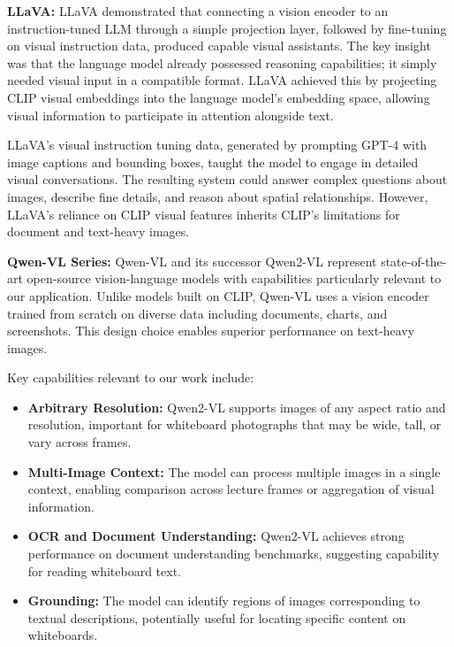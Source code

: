 \textbf{LLaVA:} LLaVA \cite{Liu2023LLaVA} demonstrated that connecting a vision encoder to an instruction-tuned LLM through a simple projection layer, followed by fine-tuning on visual instruction data, produced capable visual assistants. The key insight was that the language model already possessed reasoning capabilities; it simply needed visual input in a compatible format. LLaVA achieved this by projecting CLIP visual embeddings into the language model's embedding space, allowing visual information to participate in attention alongside text.

LLaVA's visual instruction tuning data, generated by prompting GPT-4 with image captions and bounding boxes, taught the model to engage in detailed visual conversations. The resulting system could answer complex questions about images, describe fine details, and reason about spatial relationships. However, LLaVA's reliance on CLIP visual features inherits CLIP's limitations for document and text-heavy images.

\textbf{Qwen-VL Series:} Qwen-VL \cite{Bai2023QwenVL} and its successor Qwen2-VL \cite{Wang2024Qwen2VL} represent state-of-the-art open-source vision-language models with capabilities particularly relevant to our application. Unlike models built on CLIP, Qwen-VL uses a vision encoder trained from scratch on diverse data including documents, charts, and screenshots. This design choice enables superior performance on text-heavy images.

Key capabilities relevant to our work include:
\begin{itemize}
    \item \textbf{Arbitrary Resolution:} Qwen2-VL supports images of any aspect ratio and resolution, important for whiteboard photographs that may be wide, tall, or vary across frames.
    \item \textbf{Multi-Image Context:} The model can process multiple images in a single context, enabling comparison across lecture frames or aggregation of visual information.
    \item \textbf{OCR and Document Understanding:} Qwen2-VL achieves strong performance on document understanding benchmarks, suggesting capability for reading whiteboard text.
    \item \textbf{Grounding:} The model can identify regions of images corresponding to textual descriptions, potentially useful for locating specific content on whiteboards.
\end{itemize}

